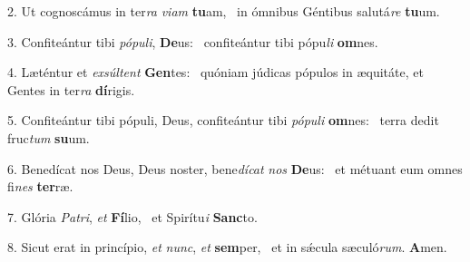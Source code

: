 2. Ut cognoscámus in ter\textit{ra} \textit{vi}\textit{am} \textbf{tu}am, \ast\  in ómnibus Géntibus salutá\textit{re} \textbf{tu}um.\

3. Confiteántur tibi \textit{pó}\textit{pu}\textit{li}, \textbf{De}us: \ast\  confiteántur tibi pópu\textit{li} \textbf{om}nes.\

4. Læténtur et \textit{ex}\textit{súl}\textit{tent} \textbf{Gen}tes: \ast\  quóniam júdicas pópulos in æquitáte, et Gentes in ter\textit{ra} \textbf{dí}rigis.\

5. Confiteántur tibi pópuli, Deus, confiteántur tibi \textit{pó}\textit{pu}\textit{li} \textbf{om}nes: \ast\  terra dedit fruc\textit{tum} \textbf{su}um.\

6. Benedícat nos Deus, Deus noster, bene\textit{dí}\textit{cat} \textit{nos} \textbf{De}us: \ast\  et métuant eum omnes fi\textit{nes} \textbf{ter}ræ.\

7. Glória \textit{Pa}\textit{tri}, \textit{et} \textbf{Fí}lio, \ast\  et Spirítu\textit{i} \textbf{Sanc}to.\

8. Sicut erat in princípio, \textit{et} \textit{nunc}, \textit{et} \textbf{sem}per, \ast\  et in sǽcula sæculó\textit{rum}. \textbf{A}men.\


